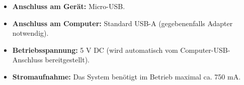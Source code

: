 \begin{itemize}
	\item \textbf{Anschluss am Gerät:} Micro-USB.
	\item \textbf{Anschluss am Computer:} Standard USB-A (gegebenenfalls Adapter notwendig).
	\item \textbf{Betriebsspannung:} 5 V DC (wird automatisch vom Computer-USB-Anschluss bereitgestellt).
	\item \textbf{Stromaufnahme:} Das System benötigt im Betrieb maximal ca. 750 mA.
\end{itemize}
